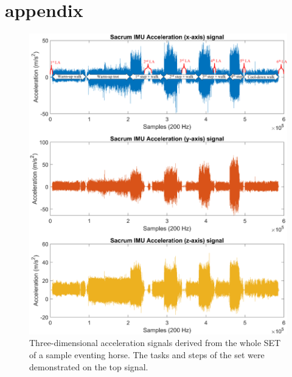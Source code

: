 \chapter{appendix}
\label{appendix:appendix2}

\begin{figure}[!htb]
\centering
\includegraphics[width=\linewidth]{chapters/data/figures/signals.png}
\caption{{Three-dimensional acceleration signals derived from the whole SET of a sample eventing horse. The tasks and steps of the \gls{set} were demonstrated on the top signal.}}
\label{fig:IMUsignals}
\end{figure}